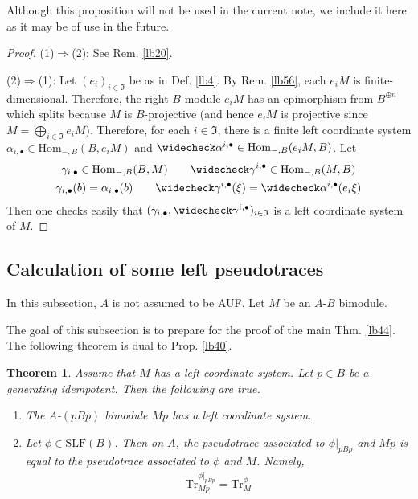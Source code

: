 \documentclass[11pt,b5paper,notitlepage]{article}
\theoremstyle{definition}
\theoremstyle{plain}
\newtheorem{thm}[df]{Theorem}
\newcommand{\fk}{\mathfrak}
\newcommand{\wch}{\widecheck}
\newcommand{\Tr}{\mathrm{Tr}}
\newcommand{\Hom}{\mathrm{Hom}}
\newcommand{\blt}{\bullet}
\newcommand{\SLF}{\mathrm{SLF}}
\numberwithin{equation}{section}
\begin{document}
Although this proposition will not be used in the current note, we include it here as it may be of use in the future.

\begin{proof}
(1)$\Rightarrow$(2): See Rem. \ref{lb20}.

(2)$\Rightarrow$(1): Let $(e_i)_{i\in \fk I}$ be as in Def. \ref{lb4}. By Rem. \ref{lb56}, each $e_iM$ is finite-dimensional. Therefore, the right $B$-module $e_iM$ has an epimorphism from $B^{\oplus n}$ which splits because $M$ is $B$-projective (and hence $e_iM$ is projective since $M=\bigoplus_{i\in\fk I}e_iM$). Therefore, for each $i\in\fk I$, there is a finite left coordinate system $\alpha_{i,\blt}\in\Hom_{-,B}(B,e_iM)$ and $\wch\alpha^{i,\blt}\in\Hom_{-,B}(e_iM,B)$. Let
\begin{gather*}
\gamma_{i,\blt}\in\Hom_{-,B}(B,M)\qquad \wch\gamma^{i,\blt}\in\Hom_{-,B}(M,B)\\
\gamma_{i,\blt}(b)=\alpha_{i,\blt}(b)\qquad\wch\gamma^{i,\blt}(\xi)=\wch\alpha^{i,\blt}(e_i\xi)
\end{gather*}
Then one checks easily that $(\gamma_{i,\blt},\wch\gamma^{i,\blt})_{i\in\fk I}$ is a left coordinate system of $M$.   
\end{proof}





\subsection{Calculation of some left pseudotraces}

In this subsection, $A$ is not assumed to be AUF. Let $M$ be an $A$-$B$ bimodule. 

The goal of this subsection is to prepare for the proof of the main Thm. \ref{lb44}.  The following theorem is dual to Prop. \ref{lb40}. 

\begin{thm}\label{lb45}
Assume that $M$ has a left coordinate system. Let $p\in B$ be a generating idempotent. Then the following are true.
\begin{enumerate}
\item The $A$-$(pBp)$ bimodule $Mp$ has a left coordinate system.
\item Let $\phi\in\SLF(B)$. Then on $A$, the pseudotrace associated to $\phi|_{pBp}$ and $Mp$ is equal to the pseudotrace associated to $\phi$ and $M$. Namely,
\begin{align}\label{eq6}
\Tr_{Mp}^{\phi|_{pBp}}=\Tr^\phi_M
\end{align}
\end{enumerate}
\end{thm}
\end{document}
